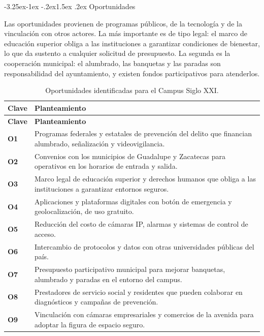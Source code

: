 \documentclass[11pt,a4paper]{article}
\makeatletter
\renewcommand\subsection{\@startsection{subsection}{2}{\z@}%
  {-3.25ex\@plus -1ex \@minus -.2ex}{1.5ex \@plus .2ex}%
  {\normalfont\large\bfseries\color{uazblue!85!black}}}
\newcommand{\clave}[1]{\textbf{\color{uazblue}#1}}
\makeatother
\begin{document}
\subsection{Oportunidades}

Las oportunidades provienen de programas públicos, de la tecnología y de la
vinculación con otros actores. La más importante es de tipo legal: el marco de
educación superior obliga a las instituciones a garantizar condiciones de
bienestar, lo que da sustento a cualquier solicitud de presupuesto. La segunda
es la cooperación municipal: el alumbrado, las banquetas y las paradas son
responsabilidad del ayuntamiento, y existen fondos participativos para
atenderlos.

{\small\singlespacing
\begin{longtable}{@{}L{1.25cm}L{13.9cm}@{}}
\caption{Oportunidades identificadas para el Campus Siglo XXI.}
\label{tab:oportunidades}\\
\toprule
\textbf{Clave} & \textbf{Planteamiento} \\
\midrule
\endfirsthead
\toprule
\textbf{Clave} & \textbf{Planteamiento} \\
\midrule
\endhead
\bottomrule
\endfoot
\bottomrule
\endlastfoot
\clave{O1}  & Programas federales y estatales de prevención del delito que financian alumbrado, señalización y videovigilancia. \\
\clave{O2}  & Convenios con los municipios de Guadalupe y Zacatecas para operativos en los horarios de entrada y salida. \\
\clave{O3}  & Marco legal de educación superior y derechos humanos que obliga a las instituciones a garantizar entornos seguros. \\
\clave{O4}  & Aplicaciones y plataformas digitales con botón de emergencia y geolocalización, de uso gratuito. \\
\clave{O5}  & Reducción del costo de cámaras IP, alarmas y sistemas de control de acceso. \\
\clave{O6}  & Intercambio de protocolos y datos con otras universidades públicas del país. \\
\clave{O7}  & Presupuesto participativo municipal para mejorar banquetas, alumbrado y paradas en el entorno del campus. \\
\clave{O8}  & Prestadores de servicio social y residentes que pueden colaborar en diagnósticos y campañas de prevención. \\
\clave{O9}  & Vinculación con cámaras empresariales y comercios de la avenida para adoptar la figura de espacio seguro. \\

\end{longtable}}
\end{document}
